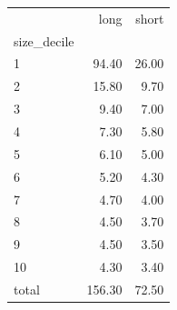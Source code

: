 \begin{tabular}{lrr}
\toprule
 & long & short \\
size_decile &  &  \\
\midrule
1 & 94.40 & 26.00 \\
2 & 15.80 & 9.70 \\
3 & 9.40 & 7.00 \\
4 & 7.30 & 5.80 \\
5 & 6.10 & 5.00 \\
6 & 5.20 & 4.30 \\
7 & 4.70 & 4.00 \\
8 & 4.50 & 3.70 \\
9 & 4.50 & 3.50 \\
10 & 4.30 & 3.40 \\
total & 156.30 & 72.50 \\
\bottomrule
\end{tabular}
